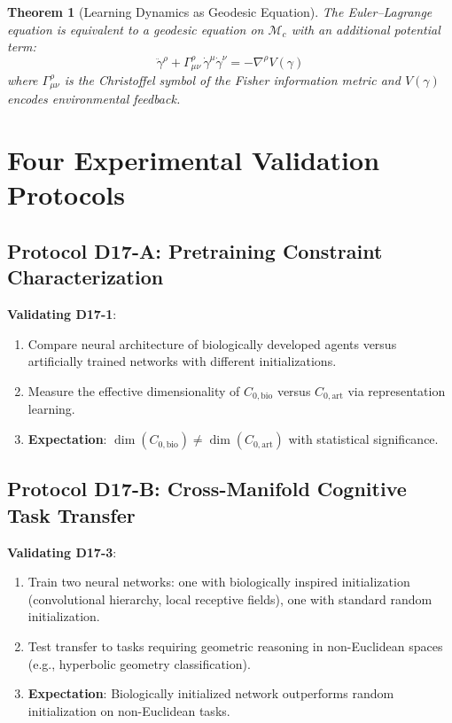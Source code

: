 \documentclass[12pt, a4paper]{article}
\newtheorem{theorem}{Theorem}[section]
\begin{document}
\begin{theorem}[Learning Dynamics as Geodesic Equation]\label{thm:D17-6}
The Euler--Lagrange equation is equivalent to a geodesic equation on $\mathcal{M}_c$ with an additional potential term:
\[
\ddot{\gamma}^\rho + \Gamma^{\rho}_{\mu\nu}\,\dot{\gamma}^\mu\dot{\gamma}^\nu = -\nabla^\rho V(\gamma)
\]
where $\Gamma^{\rho}_{\mu\nu}$ is the Christoffel symbol of the Fisher information metric and $V(\gamma)$ encodes environmental feedback.
\end{theorem}

\section{Four Experimental Validation Protocols}

\subsection{Protocol D17-A: Pretraining Constraint Characterization}

\textbf{Validating D17-1}:
\begin{enumerate}
    \item Compare neural architecture of biologically developed agents versus artificially trained networks with different initializations.
    \item Measure the effective dimensionality of $C_{0,\mathrm{bio}}$ versus $C_{0,\mathrm{art}}$ via representation learning.
    \item \textbf{Expectation}: $\dim(C_{0,\mathrm{bio}}) \neq \dim(C_{0,\mathrm{art}})$ with statistical significance.
\end{enumerate}

\subsection{Protocol D17-B: Cross-Manifold Cognitive Task Transfer}

\textbf{Validating D17-3}:
\begin{enumerate}
    \item Train two neural networks: one with biologically inspired initialization (convolutional hierarchy, local receptive fields), one with standard random initialization.
    \item Test transfer to tasks requiring geometric reasoning in non-Euclidean spaces (e.g., hyperbolic geometry classification).
    \item \textbf{Expectation}: Biologically initialized network outperforms random initialization on non-Euclidean tasks.
\end{enumerate}
\end{document}
